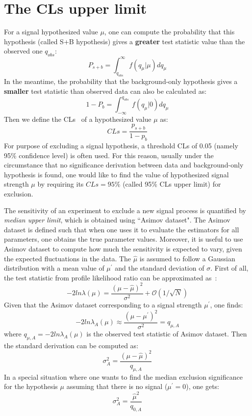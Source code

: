 \section{The CLs upper limit}

For a signal hypothesized value $\mu$, one can compute the probability that this hypothesis (called S+B hypothesis) gives a \textbf{greater} test statistic value than the observed one $q_{obs}$:
\begin{equation}
    P_{s+b} = \int_{q_{obs}}^{\infty} f(q_{\mu}|\mu) d q_{\mu}
\end{equation}
In the meantime, the probability that the background-only hypothesis gives a \textbf{smaller} test statistic than observed data can also be calculated as:
\begin{equation}
    1 - P_{b} = \int_{-\infty}^{q_{obs}} f(q_{\mu}|0) d q_{\mu}
\end{equation}
Then we define the CLs~\cite{Read_2002} of a hypothesized value $\mu$ as:
\begin{equation}
    CLs = \frac{p_{s+b}}{1-p_{b}}
\end{equation}
For purpose of excluding a signal hypothesis, a threshold CLs of 0.05 (namely 95\% confidence level) is often used.
For this reason, usually under the circumstance that no significance derivation between data and background-only hypothesis is found,
one would like to find the value of hypothesized signal strength $\mu$ by requiring its $CLs = 95\%$ (called 95\% CLs upper limit) for exclusion. 

The sensitivity of an experiment to exclude a new signal process is quantified by \textit{median upper limit},
which is obtained using ``Asimov dataset".
The Asimov dataset is defined such that when one uses it to evaluate the estimators for all parameters, one obtains the true parameter values.
Moreover, it is useful to use Asimov dataset to compute how much the sensitivity is expected to vary, given the expected fluctuations in the data.
The $\hat{\mu}$ is assumed to follow a Gaussian distribution with a mean value of $\mu^{'}$ and the standard deviation of $\sigma$.
First of all, the test statistic from profile likelihood ratio can be approximated as~\cite{}:
\begin{equation}
	-2 ln \lambda(\mu) = \frac{(\mu - \hat{\mu})^2}{\sigma^2} + \mathcal{O}(1/\sqrt{N})
\end{equation}
Given that the Asimov dataset corresponding to a signal strength $\mu^{'}$, one finds:
\begin{equation}
	-2 ln \lambda_{A}(\mu) \approx \frac{(\mu - \mu^{'})^2}{\sigma^2} = q_{\mu,A}
\end{equation}
where $q_{\mu,A} = -2ln\lambda_{A}(\mu)$ is the observed test statistic of Asimov dataset.
Then the standard derivation can be computed as:
\begin{equation}
	\sigma_A^2 = \frac{(\mu - \hat{\mu})^2}{q_{\mu,A}}
\end{equation}
In a special situation where one wants to find the median exclusion significance for the hypothesis $\mu$ assuming that there is no signal ($\mu^{'} = 0$),
one gets:
\begin{equation}
        \sigma_A^2 = \frac{\hat{\mu}^2}{q_{0,A}}
\end{equation}
